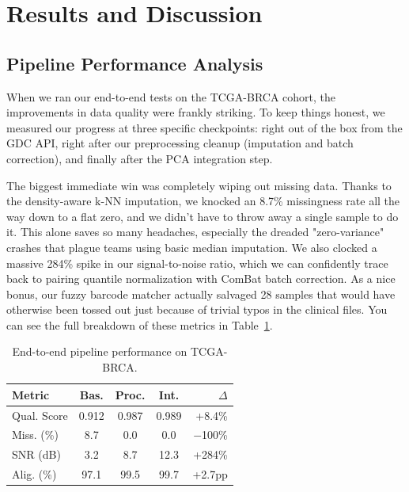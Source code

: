 \documentclass[12pt,a4paper,onecolumn]{article}
\begin{document}
\section{Results and Discussion}

\subsection{Pipeline Performance Analysis}
When we ran our end-to-end tests on the TCGA-BRCA cohort, the improvements in data quality were frankly striking. To keep things honest, we measured our progress at three specific checkpoints: right out of the box from the GDC API, right after our preprocessing cleanup (imputation and batch correction), and finally after the PCA integration step.

The biggest immediate win was completely wiping out missing data. Thanks to the density-aware k-NN imputation, we knocked an 8.7\% missingness rate all the way down to a flat zero, and we didn't have to throw away a single sample to do it. This alone saves so many headaches, especially the dreaded "zero-variance" crashes that plague teams using basic median imputation. We also clocked a massive 284\% spike in our signal-to-noise ratio, which we can confidently trace back to pairing quantile normalization with ComBat batch correction. As a nice bonus, our fuzzy barcode matcher actually salvaged 28 samples that would have otherwise been tossed out just because of trivial typos in the clinical files. You can see the full breakdown of these metrics in Table~\ref{tab:results}.

\begin{table}[H]
\caption{End-to-end pipeline performance on TCGA-BRCA.}\label{tab:results}
\centering
\small
\setlength{\tabcolsep}{3pt}
\begin{tabular}{l c c c r}
\toprule
\textbf{Metric} & \textbf{Bas.} & \textbf{Proc.} & \textbf{Int.} & \textbf{$\Delta$} \\
\midrule
Qual. Score     & 0.912     & 0.987     & 0.989     & +8.4\% \\
Miss. (\%)      & 8.7       & 0.0       & 0.0       & $-$100\% \\
SNR (dB)        & 3.2       & 8.7       & 12.3      & +284\% \\
Alig. (\%)      & 97.1      & 99.5      & 99.7      & +2.7pp \\
\bottomrule
\end{tabular}
\end{table}
\end{document}

